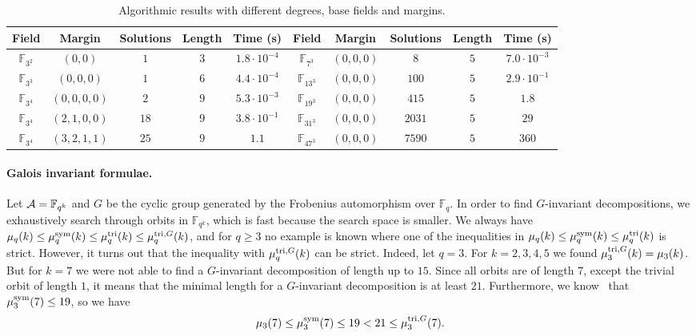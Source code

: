 \documentclass[11pt]{article}
\begin{document}
\begin{table}
  \centering
  \footnotesize
  \begin{tabular}{|c|c|c|c|c||c|c|c|c|c|}
    \hline
    Field & Margin & Solutions & Length & Time (s) & Field & Margin
    & Solutions & Length & Time (s) \\
    \hline
    \hline
    $\mathbb{F}_{3^2}$ & $(0, 0)$ & $1$ & $3$ & $1.8\cdot10^{-4}$ & $\mathbb{F}_{7^3}$ & $(0, 0, 0)$
    & $8$ & $5$ & $7.0\cdot10^{-3}$\\ 
    \hline
    $\mathbb{F}_{3^3}$ & $(0, 0, 0)$ & $1$ & $6$ & $4.4\cdot10^{-4}$ & $\mathbb{F}_{13^3}$ & $(0, 0, 0)$
    & $100$ & $5$ & $2.9\cdot10^{-1}$\\ 
    \hline
    $\mathbb{F}_{3^4}$ & $(0, 0, 0, 0)$ & $2$ & $9$ & $5.3\cdot10^{-3}$ & $\mathbb{F}_{19^3}$ & $(0, 0, 0)$
    & $415$ & $5$ & $1.8$\\ 
    \hline
    $\mathbb{F}_{3^4}$ & $(2, 1, 0, 0)$ & $18$ & $9$ & $3.8\cdot10^{-1}$ &
    $\mathbb{F}_{31^3}$ & $(0, 0, 0)$
    & $2031$ & $5$ & $29$\\ 
    \hline
    $\mathbb{F}_{3^4}$ & $(3, 2, 1, 1)$ & $25$ & $9$ & $1.1$ & $\mathbb{F}_{47^3}$ & $(0, 0, 0)$
    & $7590$ & $5$ & $360$\\ 
    \hline
  \end{tabular}
  \caption{Algorithmic results with different degrees, base fields and margins.}
  \label{tab:alg}
\end{table}

\paragraph{Galois invariant formulae.}
Let $\mathcal{A}=\mathbb{F}_{q^k}$ and $G$ be the cyclic group generated by the Frobenius
automorphism over $\mathbb{F}_{q}$. In order to find $G$-invariant decompositions,
we exhaustively search through orbits in $\mathbb{F}_{q^k}$, which is fast
because the search space is smaller.
We always have $\mu_q(k)\leq\mu^{\textrm{sym}}_q(k)\leq\mu^{\textrm{tri}}_q(k)\leq\mu^{\textrm{tri},G}_q(k)$,
and for $q\geq3$ no example is known where one of the inequalities in $\mu_q(k)\leq\mu^{\textrm{sym}}_q(k)\leq\mu^{\textrm{tri}}_q(k)$
is strict. However, it turns out that the inequality with $\mu^{\textrm{tri},G}_q(k)$ can be strict.
Indeed, let $q=3$. For $k=2,3,4,5$ we found $\mu^{\textrm{tri},G}_3(k)=\mu_3(k)$. But for $k=7$ we were not able to
find a $G$-invariant decomposition of length up to $15$. Since all orbits are of length $7$, 
except the trivial orbit of length $1$, it means that the minimal length for a $G$-invariant decomposition is
at least $21$. Furthermore, we know~\cite[table~2]{BCPRRR19} that $\mu^{\textrm{sym}}_3(7)\leq19$, so we have
\[ \mu_3(7)\leq\mu^{\textrm{sym}}_3(7)\leq 19<21\leq \mu^{\textrm{tri},G}_3(7). \]
\end{document}
